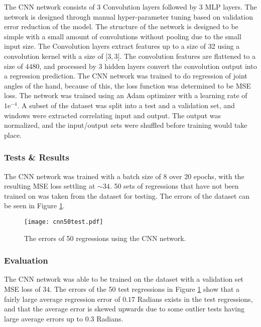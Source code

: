 \documentclass[../main.tex]{subfiles}
\begin{document}
The CNN network consists of 3 Convolution layers followed by 3 MLP layers.
The network is designed through manual hyper-parameter tuning based on validation error reduction of the model.
The structure of the network is designed to be simple with a small amount of convolutions without pooling due to the small input size.
The Convolution layers extract features up to a size of 32 using a convolution kernel with a size of [$3, 3$].
The convolution features are flattened to a size of $4480$, and processed by 3 hidden layers convert the convolution output into a regression prediction.
The CNN network was trained to do regression of joint angles of the hand, because of this, the loss function was determined to be MSE loss.
The network was trained using an Adam optimizer with a learning rate of $1\text{e}^{-4}$.
A subset of the dataset was split into a test and a validation set, and windows were extracted correlating input and output.
The output was normalized, and the input/output sets were shuffled before training would take place.


\subsubsection{Tests \& Results}


The CNN network was trained with a batch size of 8 over 20 epochs, with the resulting MSE loss settling at $\sim 34$.
50 sets of regressions that have not been trained on was taken from the dataset for testing.
The errors of the dataset can be seen in Figure \ref{fig:cnntest}.

\begin{figure}[H]
\begin{center}
\texttt{[image: cnn50test.pdf]}
\caption{The errors of 50 regressions using the CNN network.}
\label{fig:cnntest}
\end{center}
\end{figure}

\subsubsection{Evaluation}

The CNN network was able to be trained on the dataset with a validation set MSE loss of $34$.
The errors of the 50 test regressions in Figure \ref{fig:cnntest} show that a fairly large average regression error of $0.17$ Radians exists in the test regressions, and that the average error is skewed upwards due to some outlier tests having large average errors up to $0.3$ Radians.
\end{document}
